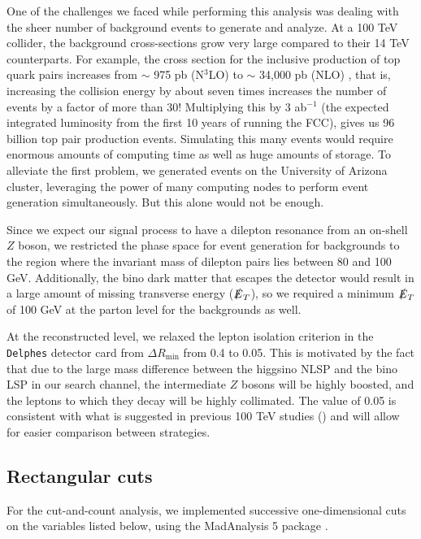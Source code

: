 One of the challenges we faced while performing this analysis was dealing with the sheer number of background events to generate and analyze. At a 100 TeV collider, the background cross-sections grow very large compared to their 14 TeV counterparts. For example, the cross section for the inclusive production of top quark pairs increases from $\sim$ 975 pb (N$^{3}$LO) to $\sim$ 34,000 pb (NLO) \citep{Mangano:2016jyj}, that is, increasing the collision energy by about seven times increases the number of events by a factor of more than 30! Multiplying this by 3 ab$^{-1}$ (the expected integrated luminosity from the first 10 years of running the FCC), gives us 96 billion top pair production events. Simulating this many events would require enormous amounts of computing time as well as huge amounts of storage. To alleviate the first problem, we generated events on the University of Arizona cluster, leveraging the power of many computing nodes to perform event generation simultaneously. But this alone would not be enough. 

Since we expect our signal process to have a dilepton resonance from an on-shell $Z$ boson, we restricted the phase space for event generation for backgrounds to the region where the invariant mass of dilepton pairs lies between 80 and 100 GeV. Additionally, the bino dark matter that escapes the detector would result in a large amount of missing transverse energy ($\slashed{E}_T$), so we required a minimum $\slashed{E}_T$ of 100 GeV at the parton level for the backgrounds as well. 

At the reconstructed level, we relaxed the lepton isolation criterion in the \texttt{Delphes} detector card from $\Delta R_\text{min}$ from 0.4 to 0.05. This is motivated by the fact that due to the large mass difference between the higgsino NLSP and the bino LSP in our search channel, the intermediate $Z$ bosons will be highly boosted, and the leptons to which they decay will be highly collimated. The value of 0.05 is consistent with what is suggested in previous 100 TeV studies (\citep{Acharya2014,Gori:2014oua,Bramante2015}) and will allow for easier comparison between strategies.


\subsection{Rectangular cuts}\label{event-selection}

For the cut-and-count analysis, we implemented successive one-dimensional cuts on the variables listed below, using the MadAnalysis 5 package \citep{Conte2013}.

